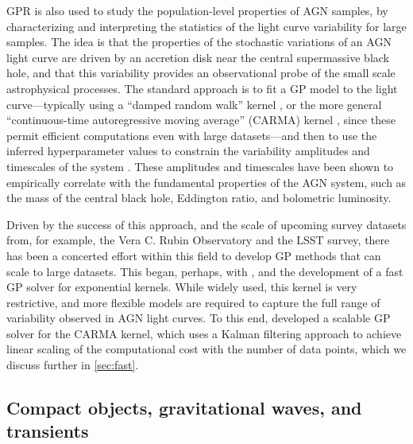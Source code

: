 \documentclass[letterpaper]{ar-1col}
\begin{document}
GPR is also used to study the population-level properties of AGN samples, by characterizing and interpreting the statistics of the light curve variability for large samples.
The idea is that the properties of the stochastic variations of an AGN light curve are driven by an accretion disk near the central supermassive black hole, and that this variability provides an observational probe of the small scale astrophysical processes.
The standard approach is to fit a GP model to the light curve---typically using a ``damped random walk'' kernel \citep[e.g.,][]{2010ApJ...708..927K, 2010ApJ...721.1014M, 2012ApJ...753..106M}, or the more general ``continuous-time autoregressive moving average'' (CARMA) kernel \citep[e.g.,][]{2014ApJ...788...33K, 2022ApJ...930..157Z, 2022ApJ...936..132Y}, since these permit efficient computations even with large datasets---and then to use the inferred hyperparameter values to constrain the variability amplitudes and timescales of the system \citep[e.g.,][]{2010ApJ...708..927K, 2010ApJ...721.1014M, 2012ApJ...753..106M, 2014ApJ...788...33K, 2017MNRAS.470.3027K, 2019PASP..131f3001M, 2022MNRAS.514..164S, 2022ApJ...930..157Z, 2022ApJ...936..132Y}.
These amplitudes and timescales have been shown to empirically correlate with the fundamental properties of the AGN system, such as the mass of the central black hole, Eddington ratio, and bolometric luminosity.

Driven by the success of this approach, and the scale of upcoming survey datasets from, for example, the Vera C. Rubin Observatory and the LSST survey, there has been a concerted effort within this field to develop GP methods that can scale to large datasets.
This began, perhaps, with \citet{pr95}, and the development of a fast GP solver for exponential kernels.
While widely used, this kernel is very restrictive, and more flexible models are required to capture the full range of variability observed in AGN light curves.
To this end, \citet{2014ApJ...788...33K} developed a scalable GP solver for the CARMA kernel, which uses a Kalman filtering approach to achieve linear scaling of the computational cost with the number of data points, which we discuss further in \autoref{sec:fast}.

\subsection{Compact objects, gravitational waves, and transients}
\end{document}

